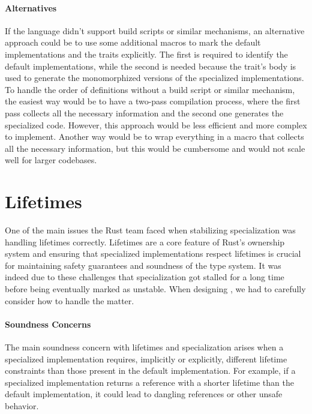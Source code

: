 \paragraph{Alternatives}\label{subsec:alternatives}
If the language didn't support build scripts or similar mechanisms, an alternative approach could be to use some additional macros to mark the default implementations and the traits explicitly.
The first is required to identify the default implementations, while the second is needed because the trait's body is used to generate the monomorphized versions of the specialized implementations.
To handle the order of definitions without a build script or similar mechanism, the easiest way would be to have a two-pass compilation process, where the first pass collects all the necessary information and the second one generates the specialized code.
However, this approach would be less efficient and more complex to implement.
Another way would be to wrap everything in a macro that collects all the necessary information, but this would be cumbersome and would not scale well for larger codebases.


\section{Lifetimes}\label{sec:lifetimes}
One of the main issues the Rust team faced when stabilizing specialization was handling lifetimes correctly.
Lifetimes are a core feature of Rust's ownership system and ensuring that specialized implementations respect lifetimes is crucial for maintaining safety guarantees and soundness of the type system.
It was indeed due to these challenges that specialization got stalled for a long time before being eventually marked as unstable.
When designing \mytool{}, we had to carefully consider how to handle the matter.

\paragraph{Soundness Concerns}
The main soundness concern with lifetimes and specialization arises when a specialized implementation requires, implicitly or explicitly, different lifetime constraints than those present in the default implementation.
For example, if a specialized implementation returns a reference with a shorter lifetime than the default implementation, it could lead to dangling references or other unsafe behavior.

